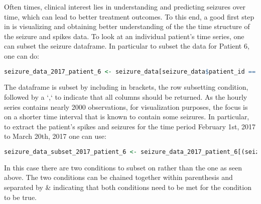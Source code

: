 Often times, clinical interest lies in understanding and predicting seizures over time, which can lead to better treatment outcomes. To this end, a good first step in is visualizing and obtaining better understanding of the the time structure of the seizure and spikes data. To look at an individual patient's time series, one can subset the seizure dataframe. In particular to subset the data for Patient 6, one can do:
\begin{lstlisting}[language=R]
seizure_data_2017_patient_6 <- seizure_data[seizure_data$patient_id == 'Patient_6', ]
\end{lstlisting}
The dataframe is subset by including in brackets, the row subsetting condition, followed by a `,` to indicate that all columns should be returned.
As the hourly series contains nearly 2000 observations, for visualization purposes, the focus is on a shorter time interval that is known to contain some seizures. In particular, to extract the patient's spikes and seizures for the time period February 1st, 2017 to March 20th, 2017 one can use:

\begin{lstlisting}[language=R]
seizure_data_subset_2017_patient_6 <- seizure_data_2017_patient_6[(seizure_data_2017_patient_6$hourly_markers > '2017-02-01 00:00:00 UTC') & (seizure_data_2017_patient_6$hourly_markers <= '2017-03-20 00:00:00 UTC'),]
\end{lstlisting}
In this case there are two conditions to subset on rather than the one as seen above. The two conditions can be chained together within parenthesis and separated by \& indicating that both conditions need to be met for the condition to be true.

